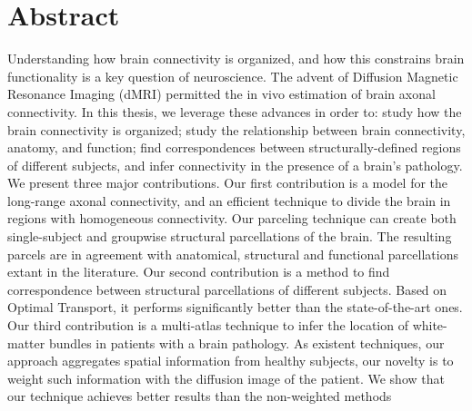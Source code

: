 \chapter{Abstract}
Understanding how brain connectivity is organized, and how
this constrains brain functionality is a key question of neuroscience. The advent
of Diffusion Magnetic Resonance Imaging (dMRI) permitted the in vivo estimation
of brain axonal connectivity. In this thesis, we leverage these advances in order
to: study how the brain connectivity is organized; study the relationship between
brain connectivity, anatomy, and function; find correspondences between 
structurally-defined regions of different subjects, and infer connectivity in
the presence of a brain’s pathology. We present three major contributions. Our
first contribution is a model for the long-range axonal connectivity, and an
efficient technique to divide the brain in regions with homogeneous connectivity.
Our parceling technique can create both single-subject and groupwise structural
parcellations of the brain. The resulting parcels are in agreement with anatomical,
structural and functional parcellations extant in the literature. Our second
contribution is a method to find correspondence between structural parcellations
of different subjects. Based on Optimal Transport, it performs significantly better
than the state-of-the-art ones. Our third contribution is a multi-atlas technique
to infer the location of white-matter bundles in patients with a brain pathology.
As existent techniques, our approach aggregates spatial information from healthy subjects,
our novelty is to weight such information with the diffusion image of the patient.
We show that our technique achieves better results than the non-weighted methods

